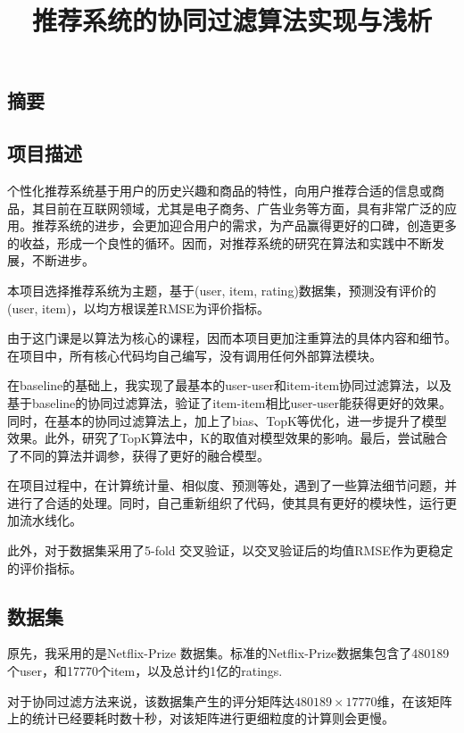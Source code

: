 \documentclass[a4paper,12pt]{ctexart}
\title{推荐系统的协同过滤算法实现与浅析}
\begin{document}
\begin{spacing}{1.35}

\maketitle
\tableofcontents
\newpage

\section{摘要}

\subsection{项目描述}

个性化推荐系统基于用户的历史兴趣和商品的特性，向用户推荐合适的信息或商品，其目前在互联网领域，尤其是电子商务、广告业务等方面，具有非常广泛的应用。推荐系统的进步，会更加迎合用户的需求，为产品赢得更好的口碑，创造更多的收益，形成一个良性的循环。因而，对推荐系统的研究在算法和实践中不断发展，不断进步。

本项目选择推荐系统为主题，基于(user, item, rating)数据集，预测没有评价的(user, item)，以均方根误差RMSE为评价指标。

由于这门课是以算法为核心的课程，因而本项目更加注重算法的具体内容和细节。在项目中，所有核心代码均自己编写，没有调用任何外部算法模块。

在baseline的基础上，我实现了最基本的user-user和item-item协同过滤算法，以及基于baseline的协同过滤算法，验证了item-item相比user-user能获得更好的效果。同时，在基本的协同过滤算法上，加上了bias、TopK等优化，进一步提升了模型效果。此外，研究了TopK算法中，K的取值对模型效果的影响。最后，尝试融合了不同的算法并调参，获得了更好的融合模型。

在项目过程中，在计算统计量、相似度、预测等处，遇到了一些算法细节问题，并进行了合适的处理。同时，自己重新组织了代码，使其具有更好的模块性，运行更加流水线化。

此外，对于数据集采用了5-fold 交叉验证，以交叉验证后的均值RMSE作为更稳定的评价指标。

\subsection{数据集}

原先，我采用的是Netflix-Prize 数据集。标准的Netflix-Prize数据集包含了480189个user，和17770个item，以及总计约1亿的ratings.

对于协同过滤方法来说，该数据集产生的评分矩阵达$480189 \times 17770$维，在该矩阵上的统计已经要耗时数十秒，对该矩阵进行更细粒度的计算则会更慢。


\end{spacing}
\end{document}
